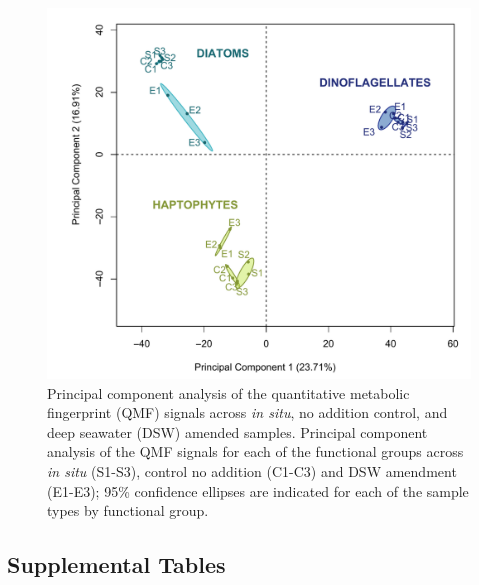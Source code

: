 
\begin{figure}[p!]
  \centering
    \includegraphics[width=1\textwidth]{Images/C4_FigureS7.pdf}
    \caption[Principal component analysis of the quantitative metabolic fingerprint (QMF) signals across \emph{in situ}, no addition control, and deep seawater amended samples]{Principal component analysis of the quantitative metabolic fingerprint (QMF) signals across \emph{in situ}, no addition control, and deep seawater (DSW) amended samples. Principal component analysis of the QMF signals for each of the functional groups across \emph{in situ} (S1-S3), control no addition (C1-C3) and DSW amendment (E1-E3); 95\% confidence ellipses are indicated for each of the sample types by functional group.}
  \label{fig:a4f7}
\end{figure}

\clearpage

\subsection{Supplemental Tables}

